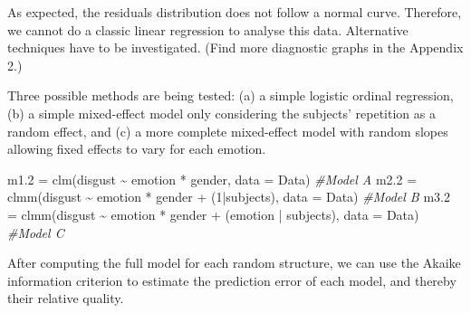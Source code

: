 \documentclass[
]{article}
\newenvironment{Shaded}{\begin{snugshade}}{\end{snugshade}}
\newcommand{\AttributeTok}[1]{\textcolor[rgb]{0.77,0.63,0.00}{#1}}
\newcommand{\CommentTok}[1]{\textcolor[rgb]{0.56,0.35,0.01}{\textit{#1}}}
\newcommand{\DecValTok}[1]{\textcolor[rgb]{0.00,0.00,0.81}{#1}}
\newcommand{\FloatTok}[1]{\textcolor[rgb]{0.00,0.00,0.81}{#1}}
\newcommand{\FunctionTok}[1]{\textcolor[rgb]{0.00,0.00,0.00}{#1}}
\newcommand{\NormalTok}[1]{#1}
\newcommand{\OtherTok}[1]{\textcolor[rgb]{0.56,0.35,0.01}{#1}}
\newcommand{\SpecialCharTok}[1]{\textcolor[rgb]{0.00,0.00,0.00}{#1}}
\begin{document}
As expected, the residuals distribution does not follow a normal curve.
Therefore, we cannot do a classic linear regression to analyse this
data. Alternative techniques have to be investigated. (Find more
diagnostic graphs in the Appendix 2.)

Three possible methods are being tested: (a) a simple logistic ordinal
regression, (b) a simple mixed-effect model only considering the
subjects' repetition as a random effect, and (c) a more complete
mixed-effect model with random slopes allowing fixed effects to vary for
each emotion.

\begin{Shaded}
\begin{Highlighting}[]
\NormalTok{m1}\FloatTok{.2} \OtherTok{=} \FunctionTok{clm}\NormalTok{(disgust }\SpecialCharTok{\textasciitilde{}}\NormalTok{ emotion }\SpecialCharTok{*}\NormalTok{ gender, }\AttributeTok{data =}\NormalTok{ Data) }\CommentTok{\#Model A}
\NormalTok{m2}\FloatTok{.2} \OtherTok{=} \FunctionTok{clmm}\NormalTok{(disgust }\SpecialCharTok{\textasciitilde{}}\NormalTok{ emotion }\SpecialCharTok{*}\NormalTok{ gender }\SpecialCharTok{+}\NormalTok{ (}\DecValTok{1}\SpecialCharTok{|}\NormalTok{subjects), }\AttributeTok{data =}\NormalTok{ Data) }\CommentTok{\#Model B}
\NormalTok{m3}\FloatTok{.2} \OtherTok{=} \FunctionTok{clmm}\NormalTok{(disgust }\SpecialCharTok{\textasciitilde{}}\NormalTok{ emotion }\SpecialCharTok{*}\NormalTok{ gender }\SpecialCharTok{+}\NormalTok{ (emotion }\SpecialCharTok{|}\NormalTok{ subjects), }\AttributeTok{data =}\NormalTok{ Data) }\CommentTok{\#Model C}
\end{Highlighting}
\end{Shaded}

After computing the full model for each random structure, we can use the
Akaike information criterion to estimate the prediction error of each
model, and thereby their relative quality.
\end{document}
